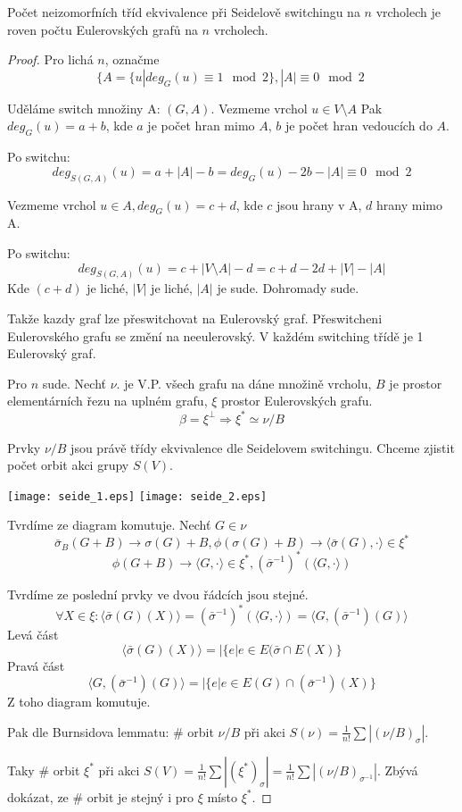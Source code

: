 \begin{theorem}
Počet neizomorfních tříd ekvivalence při Seidelově switchingu na $n$ vrcholech je roven počtu Eulerovských grafů na $n$ vrcholech.
\end{theorem}
\begin{proof}
Pro lichá $n$, označme
\[ \{ A = \{ u | deg_G(u) \equiv 1 \mod2 \}, |A| \equiv 0 \mod2\ \]

	Uděláme switch množiny A: $(G,A)$. Vezmeme vrchol $u \in V\setminus A$
	Pak $deg_G(u) = a + b$, kde $a$ je počet hran mimo $A$, $b$ je počet hran vedoucích do $A$.

	Po switchu:
	\[ deg_{S(G,A)}(u) = a + |A| - b = deg_G(u) - 2b - |A| \equiv 0 \mod2 \]

	Vezmeme vrchol $u \in A, deg_G(u) = c + d$, kde $c$ jsou hrany v A, $d$ hrany mimo A.

	Po switchu:
	\[ deg_{S(G,A)}(u) = c + |V \setminus A| - d = c + d - 2d + |V| - |A|\]
	Kde $(c + d)$ je liché, $|V|$ je liché, $|A|$ je sude. Dohromady sude.

	Takže kazdy graf lze přeswitchovat na Eulerovský graf. Přeswitcheni Eulerovského grafu se změní na neeulerovský. V každém switching třídě je 1 Eulerovský graf.

	Pro $n$ sude. Nechť $\nu$. je V.P. všech grafu na dáne množině vrcholu, $B$ je prostor elementárních řezu na uplném grafu, $\xi$ prostor Eulerovských grafu.
	\[ \beta = \xi^{\perp} \Rightarrow \xi^{\ast} \simeq \nu/B \]

	Prvky $\nu/B$ jsou právě třídy ekvivalence dle Seidelovem switchingu. Chceme zjistit počet orbit akci grupy $S(V)$.

	\texttt{[image: seide\_1.eps]}
	\texttt{[image: seide\_2.eps]}

	Tvrdíme ze diagram komutuje. Nechť $G \in \nu$
	\[ \bar{\sigma}_B(G + B) \to \sigma(G) + B, \phi(\sigma(G) + B) \to \langle \bar{\sigma}(G), \cdot \rangle \in \xi^{\ast} \]
	\[ \phi(G + B) \to \langle G, \cdot \rangle \in \xi^{\ast}, (\bar{\sigma}^{-1})^{\ast}(\langle G, \cdot \rangle) \]

	Tvrdíme ze poslední prvky ve dvou řádcích jsou stejné.
	\[ \forall X \in \xi: \langle \bar{\sigma}(G)(X) \rangle = (\bar{\sigma}^{-1})^{\ast}(\langle G, \cdot \rangle) = \langle G, (\bar{\sigma}^{-1})(G) \rangle \]
	Levá část
	\[ \langle \bar{\sigma}(G)(X) \rangle = |\{ e | e \in E(\bar{\sigma} \cap E(X) \} \]
	Pravá část
	\[ \langle G, (\bar{\sigma}^{-1})(G) \rangle = |\{ e | e \in E(G) \cap (\bar{\sigma}^{-1})(X) \} \]
	Z toho diagram komutuje.

	Pak dle Burnsidova lemmatu: \# orbit $\nu/B$ při akci $S(\nu) = \frac{1}{n!} \sum |(\nu/B)_{\sigma}|$.

	Taky \# orbit $\xi^{\ast}$ při akci $S(V) = \frac{1}{n!} \sum |(\xi^{\ast})_{\sigma}| = \frac{1}{n!} \sum |(\nu/B)_{\sigma^{-1}}|$.
	Zbývá dokázat, ze \# orbit je stejný i pro $\xi$ místo $\xi^{\ast}$.

\end{proof}
